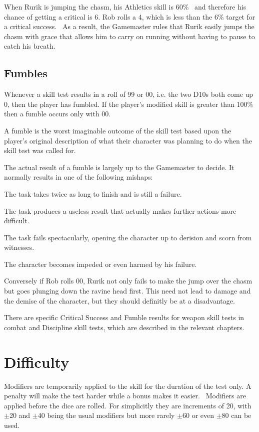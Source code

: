 \begin{rpg-examplebox}
When Rurik is jumping the chasm, his Athletics skill is 60\%  and therefore his chance of getting a critical is 6. Rob rolls a 4, which is less than the 6\% target for a critical success.  As a result, the Gamemaster rules that Rurik easily jumps the chasm with grace that allows him to carry on running without having to pause to catch his breath.
\end{rpg-examplebox}

\subsection{Fumbles}
Whenever a skill test results in a roll of 99 or 00, i.e. the two D10s both come up 0, then the player has fumbled. If the player's modified skill is greater than 100\% then a fumble occurs only with 00.

A fumble is the worst imaginable outcome of the skill test based upon the player’s original description of what their character was planning to do when the skill test was called for.

The actual result of a fumble is largely up to the Gamemaster to decide. It normally results in one of the following mishaps: 

\begin{rpg-list}
\item The task takes twice as long to finish and is still a failure. 
\item The task produces a useless result that actually makes further actions more difficult. 
\item The task fails spectacularly, opening the character up to derision and scorn from witnesses. 
\item The character becomes impeded or even harmed by his failure. 
\end{rpg-list}

Conversely if Rob rolls 00, Rurik not only fails to make the jump over the chasm but goes plunging down the ravine head first. This need not lead to damage and the demise of the character, but they should definitly be at a disadvantage.

There are specific Critical Success and Fumble results for weapon skill tests in combat and Discipline skill tests, which are described in the relevant chapters.


\section{Difficulty}
Modifiers are temporarily applied to the skill for the duration of the test only. A penalty will make the test harder while a bonus makes it easier.  Modifiers are applied before the dice are rolled. For simplicitly they are increments of 20, with $\pm$20 and $\pm$40 being the usual modifiers but more rarely $\pm$60 or even $\pm$80 can be used.

